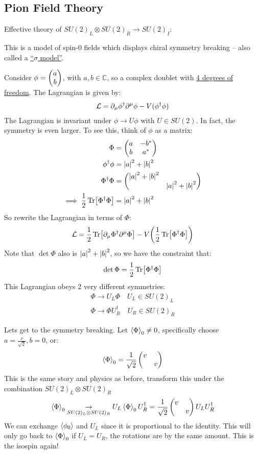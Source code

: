 \subsection{Pion Field Theory}
Effective theory of $SU(2)_L\otimes SU(2)_R\to SU(2)_I$:

This is a model of spin-0 fields which displays chiral symmetry breaking -- also called a \underline{``$\sigma$ model''}.

Consider $\phi=\pmqty{a\\b}$, with $a,b\in\mathbb{C}$, so a complex doublet with \underline{4 degrees of freedom}. The Lagrangian is given by:
\begin{align*}
  \mathcal{L}=\partial_\mu\phi^\dag\partial^\mu\phi-V(\phi^\dag\phi)
\end{align*}
The Lagrangian is invariant under $\phi\to U\phi$ with $U\in SU(2)$.
In fact, the symmetry is even larger. To see this, think of $\phi$ as a matrix:
\begin{align*}
  \Phi &= \pmqty{a&-b^*\\b&a^*}\\
  \phi^\dag\phi&=\abs{a}^2+\abs{b}^2\\
  \Phi^\dag\Phi&=\pmqty{\abs{a}^2+\abs{b}^2\\&\abs{a}^2+\abs{b}^2}\\
  \implies\frac12\Tr[\Phi^\dag\Phi]&=\abs{a}^2+\abs{b}^2
\end{align*}
So rewrite the Lagrangian in terms of $\Phi$:
\begin{align*}
  \mathcal{L}=\frac12\Tr[\partial_\mu\Phi^\dag\partial^\mu\Phi]-V\qty(\frac12\Tr[\Phi^\dag\Phi])
\end{align*}
Note that $\det\Phi$ also is $\abs{a}^2+\abs{b}^2$, so we have the constraint that:
\begin{align*}
  \det\Phi=\frac12\Tr[\Phi^\dag\Phi]
\end{align*}
This Lagrangian obeys 2 very different symmetries:
\begin{align*}
  \Phi\to U_L\Phi\quad U_L\in SU(2)_L\\
  \Phi\to \Phi U_R^\dag\quad U_R\in SU(2)_R
\end{align*}

Lets get to the symmetry breaking. Let $\ev{\Phi}_0\neq0$, specifically choose $a=\frac{v}{\sqrt{2}},b=0$, or:
\begin{align*}
  \ev{\Phi}_0=\frac1{\sqrt{2}}\pmqty{v\\&v}
\end{align*}
This is the same story and physics as before, transform this under the combination $SU(2)_L\otimes SU(2)_R$
\begin{align*}
  \ev{\Phi}_0\underset{SU(2)_L\otimes SU(2)_R}{\to}
  U_L\ev{\Phi}_0U^\dag_R=\frac1{\sqrt{2}}\pmqty{v\\&v}U_LU_R^\dag
\end{align*}
We can exchange $\ev{\phi_0}$ and $U_L$ since it is proportional to the identity. This will only go back to $\ev{\Phi}_0$ if $U_L=U_R$, the rotations are by the same amount. This is the isospin again!

